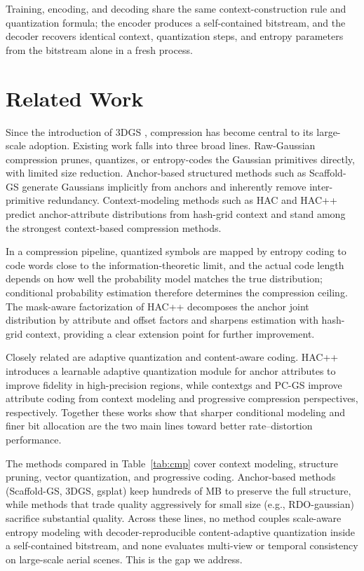 \documentclass[conference]{IEEEtran}
\begin{document}
Training, encoding, and decoding share the same context-construction
rule and quantization formula; the encoder produces a self-contained
bitstream, and the decoder recovers identical context, quantization
steps, and entropy parameters from the bitstream alone in a fresh
process.

\section{Related Work}
Since the introduction of 3DGS \cite{kerbl2023}, compression has become
central to its large-scale adoption. Existing work falls into three
broad lines. Raw-Gaussian compression prunes, quantizes, or
entropy-codes the Gaussian primitives directly, with limited size
reduction. Anchor-based structured methods such as Scaffold-GS
\cite{lu2024} generate Gaussians implicitly from anchors and inherently
remove inter-primitive redundancy. Context-modeling methods such as HAC
\cite{chen2024} and HAC++ \cite{chen2025} predict anchor-attribute
distributions from hash-grid context and stand among the strongest
context-based compression methods.

In a compression pipeline, quantized symbols are mapped by entropy
coding to code words close to the information-theoretic limit, and the
actual code length depends on how well the probability model matches the
true distribution; conditional probability estimation therefore
determines the compression ceiling. The mask-aware factorization of
HAC++ decomposes the anchor joint distribution by attribute and offset
factors and sharpens estimation with hash-grid context, providing a
clear extension point for further improvement.

Closely related are adaptive quantization and content-aware coding.
HAC++ introduces a learnable adaptive quantization module for anchor
attributes to improve fidelity in high-precision regions, while
contextgs and PC-GS improve attribute coding from context modeling and
progressive compression perspectives, respectively. Together these works
show that sharper conditional modeling and finer bit allocation are the
two main lines toward better rate--distortion performance.

The methods compared in Table~\ref{tab:cmp} cover context modeling,
structure pruning, vector quantization, and progressive coding.
Anchor-based methods (Scaffold-GS, 3DGS, gsplat) keep hundreds of MB to
preserve the full structure, while methods that trade quality
aggressively for small size (e.g., RDO-gaussian) sacrifice substantial
quality. Across these lines, no method couples scale-aware entropy
modeling with decoder-reproducible content-adaptive quantization inside a
self-contained bitstream, and none evaluates multi-view or temporal
consistency on large-scale aerial scenes. This is the gap we address.
\end{document}
